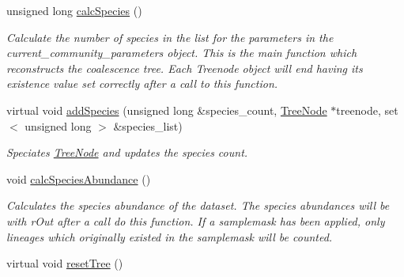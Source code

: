 \begin{DoxyCompactItemize}
unsigned long \hyperlink{class_community_a241f69d1f69e61fc53c112fd874bf3ba}{calc\+Species} ()
\begin{DoxyCompactList}\small\item\em Calculate the number of species in the list for the parameters in the current\+\_\+community\+\_\+parameters object. This is the main function which reconstructs the coalescence tree. Each Treenode object will end having its existence value set correctly after a call to this function. \end{DoxyCompactList}\item 
virtual void \hyperlink{class_community_a7a51d163ec40883125fde38e6e85e52e}{add\+Species} (unsigned long \&species\+\_\+count, \hyperlink{class_tree_node}{Tree\+Node} $\ast$treenode, set$<$ unsigned long $>$ \&species\+\_\+list)
\begin{DoxyCompactList}\small\item\em Speciates \hyperlink{class_tree_node}{Tree\+Node} and updates the species count. \end{DoxyCompactList}\item 
void \hyperlink{class_community_a502a409a75567d78575625346b6a969f}{calc\+Species\+Abundance} ()\hypertarget{class_community_a502a409a75567d78575625346b6a969f}{}\label{class_community_a502a409a75567d78575625346b6a969f}

\begin{DoxyCompactList}\small\item\em Calculates the species abundance of the dataset. The species abundances will be with r\+Out after a call do this function. If a samplemask has been applied, only lineages which originally existed in the samplemask will be counted. \end{DoxyCompactList}\item 
virtual void \hyperlink{class_community_abd099aacb5332a9b89b3421e01269d24}{reset\+Tree} ()\hypertarget{class_community_abd099aacb5332a9b89b3421e01269d24}{}\label{class_community_abd099aacb5332a9b89b3421e01269d24}


\end{DoxyCompactItemize}
